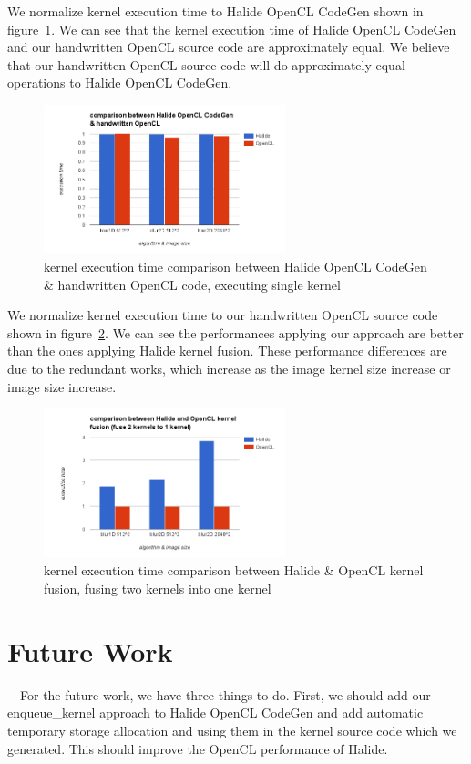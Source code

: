 \documentclass{sigplanconf}
\begin{document}
    We normalize kernel execution time to Halide OpenCL CodeGen shown in figure~\ref{fig:my_label_ex_5}. We can see that the kernel execution time of Halide OpenCL CodeGen and our handwritten OpenCL source code are approximately equal. We believe that our handwritten OpenCL source code will do approximately equal operations to Halide OpenCL CodeGen.

\begin{figure}[hbtp]
\centering
\includegraphics[width=7cm]{img/Halide-OpenCL-1ker-comp.png}
\caption{kernel execution time comparison between Halide OpenCL CodeGen \& handwritten OpenCL code, executing single kernel}
\label{fig:my_label_ex_5}
\end{figure}

    We normalize kernel execution time to our handwritten OpenCL source code shown in figure~\ref{fig:my_label_ex_6}. We can see the performances applying our approach are better than the ones applying Halide kernel fusion. These performance differences are due to the redundant works, which increase as the image kernel size increase or image size increase.

\begin{figure}[hbtp]
\centering
\includegraphics[width=7cm]{img/Halide-OpenCL-2ker-comp.png}
\caption{kernel execution time comparison between Halide \& OpenCL kernel fusion, fusing two kernels into one kernel}
\label{fig:my_label_ex_6}
\end{figure}

\section{Future Work}
\quad\ \ For the future work, we have three things to do. First, we should add our enqueue\_kernel approach to Halide OpenCL CodeGen and add automatic temporary storage allocation and using them in the kernel source code which we generated. This should improve the OpenCL performance of Halide.
\end{document}
